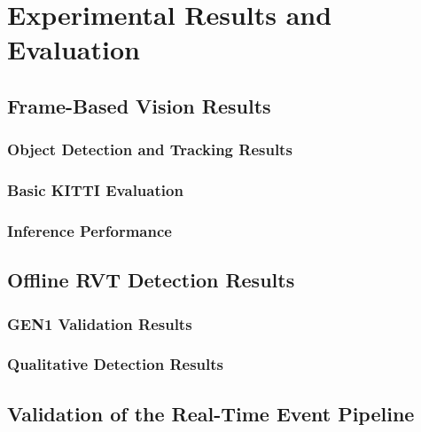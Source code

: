 \chapter{Experimental Results and Evaluation}

\section{Frame-Based Vision Results}
\subsection{Object Detection and Tracking Results}
\subsection{Basic KITTI Evaluation}
\subsection{Inference Performance}

\section{Offline RVT Detection Results}
\subsection{GEN1 Validation Results}
\subsection{Qualitative Detection Results}

\section{Validation of the Real-Time Event Pipeline}
